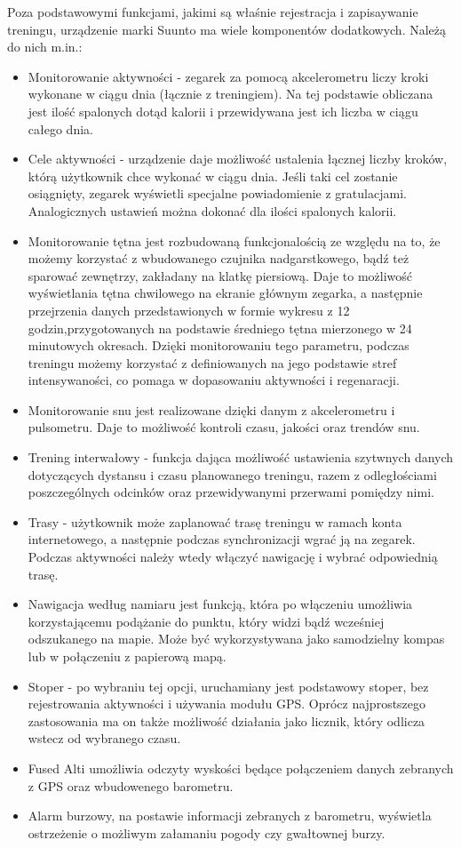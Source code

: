 \documentclass[a4paper,12pt,reqno]{article}
\begin{document}
Poza podstawowymi funkcjami, jakimi są właśnie rejestracja i zapisaywanie treningu, urządzenie marki Suunto ma wiele komponentów dodatkowych. Należą do nich m.in.:\\
\begin{itemize}
	\item Monitorowanie aktywności - zegarek za pomocą akcelerometru liczy kroki wykonane w ciągu dnia (łącznie z treningiem). Na tej podstawie obliczana jest ilość spalonych dotąd kalorii i przewidywana jest ich liczba w ciągu całego dnia.
	\item Cele aktywności - urządzenie daje możliwość ustalenia łącznej liczby kroków, którą użytkownik chce wykonać w ciągu dnia. Jeśli taki cel zostanie osiągnięty, zegarek wyświetli specjalne powiadomienie z gratulacjami. Analogicznych ustawień można dokonać dla ilości spalonych kalorii.
	\item Monitorowanie tętna jest rozbudowaną funkcjonalością ze względu na to, że możemy korzystać z wbudowanego czujnika nadgarstkowego, bądź też sparować zewnętrzy, zakładany na klatkę piersiową. Daje to możliwość wyświetlania tętna chwilowego na ekranie głównym zegarka, a następnie przejrzenia danych przedstawionych w formie wykresu z 12 godzin,przygotowanych na podstawie średniego tętna mierzonego w 24 minutowych okresach. Dzięki monitorowaniu tego parametru, podczas treningu możemy korzystać z definiowanych na jego podstawie stref intensywaności, co pomaga w dopasowaniu aktywności i regenaracji.
	\item Monitorowanie snu jest realizowane dzięki danym z akcelerometru i pulsometru. Daje to możliwość kontroli czasu, jakości oraz trendów snu.
	\item Trening interwałowy - funkcja dająca możliwość ustawienia szytwnych danych dotyczących dystansu i czasu planowanego treningu, razem z odległościami poszczególnych odcinków oraz przewidywanymi przerwami pomiędzy nimi.
	\item Trasy - użytkownik może zaplanować trasę treningu w ramach konta internetowego, a następnie podczas synchronizacji wgrać ją na zegarek. Podczas aktywności należy wtedy włączyć nawigację i wybrać odpowiednią trasę.
	\item Nawigacja według namiaru jest funkcją, która po włączeniu umożliwia korzystającemu podążanie do punktu, który widzi bądź wcześniej odszukanego na mapie. Może być wykorzystywana jako samodzielny kompas lub w połączeniu z papierową mapą.
	\item Stoper - po wybraniu tej opcji, uruchamiany jest podstawowy stoper, bez rejestrowania aktywności i używania modułu GPS. Oprócz najprostszego zastosowania ma on także możliwość działania jako licznik, który odlicza wstecz od wybranego czasu.
	\item Fused Alti umożliwia odczyty wyskości będące połączeniem danych zebranych z GPS oraz wbudowenego barometru.
	\item Alarm burzowy, na postawie informacji zebranych z barometru, wyświetla ostrzeżenie o możliwym załamaniu pogody czy gwałtownej burzy.
\end{itemize}
\end{document}
